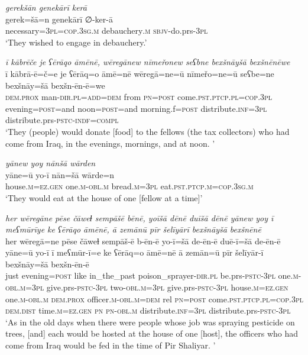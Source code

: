 \ea \label{BP.35}
\textit{gerekšān genekārī kerā} \\ 
\gll gerek=šā=n genekārī ∅-ker-ā \\ 
 necessary\textsc{=3pl}\textsc{=cop}\textsc{.3sg}\textsc{.m} debauchery\textsc{.m} \textsc{sbjv-}do.prs\textsc{-3pl} \\ 
\glt `They wished to engage in debauchery.'
\z 
 
\ea \label{BP.38}
\textit{ī kābrēče je ʕērāqo āmēnē, wēregānew nīmeřonew seʕbne bexšnāyšā bexšnēnēwe} \\ 
\gll ī kābrā-ē=č=e je ʕērāq=o āmē=nē wēregā=ne=ū nīmeřo=ne=ū seʕbe=ne bexšnāy=šā bexšn-ēn-ē=we \\ 
 \textsc{dem.prox} man\textsc{-dir}\textsc{.pl}\textsc{=add}\textsc{=dem} from \textsc{pn}\textsc{=\textsc{post}} come\textsc{.pst}\textsc{.ptcp}\textsc{.pl}\textsc{=cop}\textsc{.3pl} evening\textsc{=\textsc{post}}=and noon\textsc{=\textsc{post}}=and morning.f\textsc{=\textsc{post}} distribute\textsc{.inf}\textsc{=3pl} distribute.prs\textsc{-pstc}\textsc{-indf}\textsc{=compl} \\ 
\glt `They (people) would donate [food] to the fellows (the tax collectors) who had come from Iraq, in the evenings, mornings, and at noon. '
\z 
 
\ea \label{BP.39}
\textit{yānew yoy nānšā wārden} \\ 
\gll yāne=ū yo-ī nān=šā wārde=n \\ 
 house\textsc{.m}\textsc{=ez.gen} one\textsc{.m}\textsc{-obl}\textsc{.m} bread\textsc{.m}\textsc{=3pl} eat\textsc{.pst}\textsc{.ptcp}\textsc{.m}\textsc{=cop}\textsc{.3sg}\textsc{.m} \\ 
\glt `They would eat at the house of one [fellow at a time]'
\z 
 
\ea \label{BP.40}
\textit{her wēregāne pēse čāweɫ sempāšē bēnē, yoīšā dēnē duīšā dēnē yānew yoy ī meʕmūrīye ke ʕērāqo āmēnē, ā zemānū pīr šelīyārī bexšnāyšā bexšnēnē} \\ 
\gll her wēregā=ne pēse čāweɫ sempāš-ē b-ēn-ē yo-ī=šā de-ēn-ē duē-ī=šā de-ēn-ē yāne=ū yo-ī ī meʕmūr-ī=e ke ʕērāq=o āmē=nē ā zemān=ū pīr šelīyār-ī bexšnāy=šā bexšn-ēn-ē \\ 
 just evening\textsc{=\textsc{post}} like in\_the\_past poison\_sprayer\textsc{-dir}\textsc{.pl} be.prs\textsc{-pstc}\textsc{-3pl} one\textsc{.m}\textsc{-obl}\textsc{.m}\textsc{=3pl} give.prs\textsc{-pstc}\textsc{-3pl} two\textsc{-obl}\textsc{.m}\textsc{=3pl} give.prs\textsc{-pstc}\textsc{-3pl} house\textsc{.m}\textsc{=ez.gen} one\textsc{.m}\textsc{-obl}\textsc{.m} \textsc{dem.prox} officer\textsc{.m}\textsc{-obl}\textsc{.m}\textsc{=dem} rel \textsc{pn}\textsc{=\textsc{post}} come\textsc{.pst}\textsc{.ptcp}\textsc{.pl}\textsc{=cop}\textsc{.3pl} \textsc{dem.dist} time\textsc{.m}\textsc{=ez.gen} \textsc{pn} \textsc{pn}\textsc{-obl}\textsc{.m} distribute\textsc{.inf}\textsc{=3pl} distribute.prs\textsc{-pstc}\textsc{-3pl} \\ 
\glt `As in the old days when there were people whose job was spraying pesticide on trees, [and] each would be hosted at the house of one [host], the officers who had come from Iraq would be fed in the time of Pir Shaliyar. '
\z 
 

